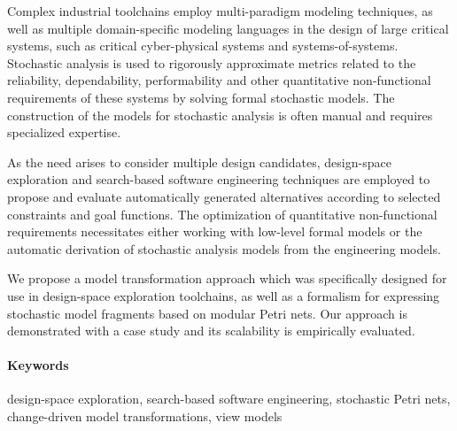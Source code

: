 Complex industrial toolchains employ multi-paradigm modeling techniques, as well as multiple domain-specific modeling languages in the design of large critical systems, such as critical cyber-physical systems and systems-of-systems. Stochastic analysis is used to rigorously approximate metrics related to the reliability, dependability, performability and other quantitative non-functional requirements of these systems by solving formal stochastic models. The construction of the models for stochastic analysis is often manual and requires specialized expertise.

As the need arises to consider multiple design candidates, design-space exploration and search-based software engineering techniques are employed to propose and evaluate automatically generated alternatives according to selected constraints and goal functions. The optimization of quantitative non-functional requirements necessitates either working with low-level formal models or the automatic derivation of stochastic analysis models from the engineering models.

We propose a model transformation approach which was specifically designed for use in design-space exploration toolchains, as well as a formalism for expressing stochastic model fragments based on modular Petri nets. Our approach is demonstrated with a case study and its scalability is empirically evaluated.

\paragraph{Keywords} design-space exploration, search-based software engineering, stochastic Petri nets, change-driven model transformations, view models

\vspace*{0pt plus 1fill}

